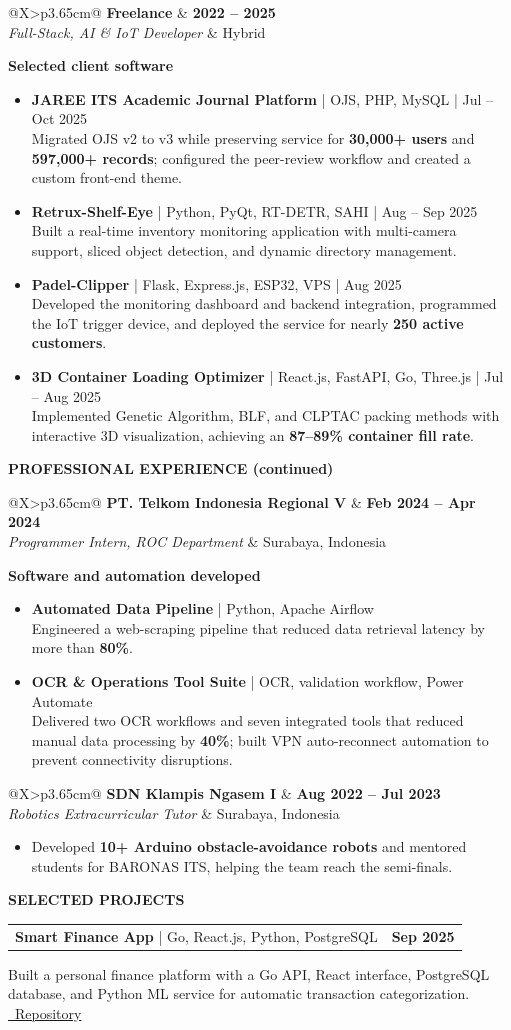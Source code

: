 \documentclass[a4paper,10pt]{article}
\makeatletter
\newcommand{\cvsection}[1]{%
  \par\vspace{7pt}
  {\color{navy}\bfseries\fontsize{10.5}{12}\selectfont #1}\par
  \vspace{2pt}{\color{teal}\hrule height 1.1pt}\vspace{4pt}
}
\newcommand{\role}[4]{%
  \begin{tabularx}{\linewidth}{@{}X>{\raggedleft\arraybackslash}p{3.65cm}@{}}
    \textbf{\color{navy}#1} & \textbf{\small #4}\\
    \textit{#2} & \textcolor{muted}{#3}
  \end{tabularx}\vspace{2pt}
}
\newcommand{\software}[3]{%
  \item \textbf{\color{navy}#1} \textcolor{muted}{\footnotesize | #2}\\[-1pt]
  #3
}
\newcommand{\impact}[1]{\item #1}
\newcommand{\project}[4]{%
  \begin{tabularx}{\linewidth}{@{}X>{\raggedleft\arraybackslash}p{3.65cm}@{}}
    \textbf{\color{navy}#1} \textcolor{muted}{\footnotesize | #2} & \textbf{\small #3}
  \end{tabularx}\vspace{-1pt}
  #4\par\vspace{4pt}
}
\newcommand{\compactliststart}{%
  \begin{itemize}[leftmargin=13pt,label={\color{teal}\raisebox{0.35ex}{\rule{3pt}{3pt}}},
    itemsep=3.5pt,topsep=1pt,parsep=0pt,partopsep=0pt]
}
\newcommand{\compactlistend}{\end{itemize}}
\newcommand{\plainliststart}{%
  \begin{itemize}[leftmargin=13pt,label={\color{teal}\textbullet},
    itemsep=2pt,topsep=1pt,parsep=0pt,partopsep=0pt]
}
\newcommand{\plainlistend}{\end{itemize}}
\makeatother
\begin{document}
\role{Freelance}{Full-Stack, AI \& IoT Developer}{Hybrid}{2022 -- 2025}
{\small\textbf{Selected client software}}
\compactliststart
  \software{JAREE ITS Academic Journal Platform}{OJS, PHP, MySQL | Jul -- Oct 2025}{Migrated OJS v2 to v3 while preserving service for \textbf{30,000+ users} and \textbf{597,000+ records}; configured the peer-review workflow and created a custom front-end theme.}
  \software{Retrux-Shelf-Eye}{Python, PyQt, RT-DETR, SAHI | Aug -- Sep 2025}{Built a real-time inventory monitoring application with multi-camera support, sliced object detection, and dynamic directory management.}
  \software{Padel-Clipper}{Flask, Express.js, ESP32, VPS | Aug 2025}{Developed the monitoring dashboard and backend integration, programmed the IoT trigger device, and deployed the service for nearly \textbf{250 active customers}.}
  \software{3D Container Loading Optimizer}{React.js, FastAPI, Go, Three.js | Jul -- Aug 2025}{Implemented Genetic Algorithm, BLF, and CLPTAC packing methods with interactive 3D visualization, achieving an \textbf{87--89\% container fill rate}.}
\compactlistend

\newpage

\cvsection{PROFESSIONAL EXPERIENCE {\normalfont\small(continued)}}
\role{PT. Telkom Indonesia Regional V}{Programmer Intern, ROC Department}{Surabaya, Indonesia}{Feb 2024 -- Apr 2024}
{\small\textbf{Software and automation developed}}
\compactliststart
  \software{Automated Data Pipeline}{Python, Apache Airflow}{Engineered a web-scraping pipeline that reduced data retrieval latency by more than \textbf{80\%}.}
  \software{OCR \& Operations Tool Suite}{OCR, validation workflow, Power Automate}{Delivered two OCR workflows and seven integrated tools that reduced manual data processing by \textbf{40\%}; built VPN auto-reconnect automation to prevent connectivity disruptions.}
\compactlistend

\role{SDN Klampis Ngasem I}{Robotics Extracurricular Tutor}{Surabaya, Indonesia}{Aug 2022 -- Jul 2023}
\plainliststart
  \impact{Developed \textbf{10+ Arduino obstacle-avoidance robots} and mentored students for BARONAS ITS, helping the team reach the semi-finals.}
\plainlistend

\cvsection{SELECTED PROJECTS}
\project{Smart Finance App}{Go, React.js, Python, PostgreSQL}{Sep 2025}{Built a personal finance platform with a Go API, React interface, PostgreSQL database, and Python ML service for automatic transaction categorization. \href{https://github.com/still-breath/finance-app-go}{\color{teal}\faGithub\ Repository}}
\end{document}
